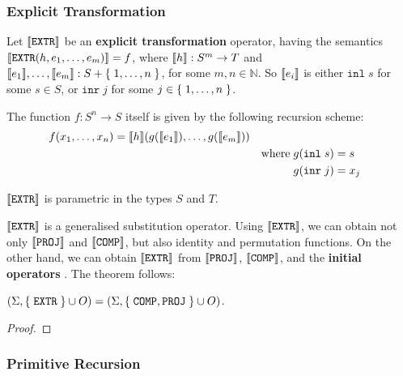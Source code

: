 \subsubsection{Explicit Transformation}

\begin{definition} \cite[p. 21]{smullyan-1961} Let $\sem{\mathtt{EXTR}}$ be an
\textbf{explicit transformation} operator, having the semantics
$\sem{\mathtt{EXTR}\p{h,e_1,\ldots,e_m}} = f$, where $\sem{h} : S^m \rightarrow
T$ and $\sem{e_1}, \ldots, \sem{e_m} : S + \set{1,\ldots,n}$, for some $m,n \in
\mathbb{N}$. So $\sem{e_i}$ is either $\mathtt{inl} \; s$ for some $s \in S$,
or $\mathtt{inr} \; j$ for some $j \in \set{1,\ldots, n}$.

The function $f : S^n \rightarrow S$ itself is given by the following recursion
scheme:\begin{alignat*}{3}
%
f\p{x_1,\ldots,x_n} &= \sem{h}\p{g\p{\sem{e_1}},\ldots,g\p{\sem{e_m}}} \\
%
& & \text{where} \; g\p{\mathtt{inl} \; s} &= s \\
%
& & g\p{\mathtt{inr} \; j} &= x_j
%
\end{alignat*}

\end{definition}

\begin{remark} $\sem{\mathtt{EXTR}}$ is parametric in the types $S$ and $T$.
\end{remark}

$\sem{\mathtt{EXTR}}$ is a generalised substitution operator. Using
$\sem{\mathtt{EXTR}}$, we can obtain not only $\sem{\mathtt{PROJ}}$ and
$\sem{\mathtt{COMP}}$, but also identity and permutation functions.  On the
other hand, we can obtain $\sem{\mathtt{EXTR}}$ from $\sem{\mathtt{PROJ}}$,
$\sem{\mathtt{COMP}}$, and the {\bfseries \color{red} initial operators}
\cite{rose-1984}. The theorem follows:

\begin{theorem}\label{thm:extr-comp-proj} $\p{\Sigma,\set{\mathtt{EXTR}} \cup
O} = \p{\Sigma,\set{\mathtt{COMP}, \mathtt{PROJ}} \cup O}$. \end{theorem}

\begin{proof}  \end{proof}

\subsubsection{Primitive Recursion}

